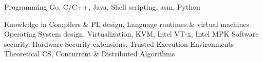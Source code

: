 


\begin{cvskills}


\cvskill
{Programming} %
{Go, C/C++, Java, Shell scripting, asm, Python} %

\cvskill
{}{}

\cvskill
{Knowledge in} %
{Compilers \& PL design, Language runtimes \& virtual machines\linebreak
 Operating System design, Virtualization, KVM, Intel VT-x, Intel MPK\linebreak
 Software security, Hardware Security extensions, Trusted Execution Environments\linebreak
  Theoretical CS, Concurrent \& Distributed Algorithms} %

\end{cvskills}
